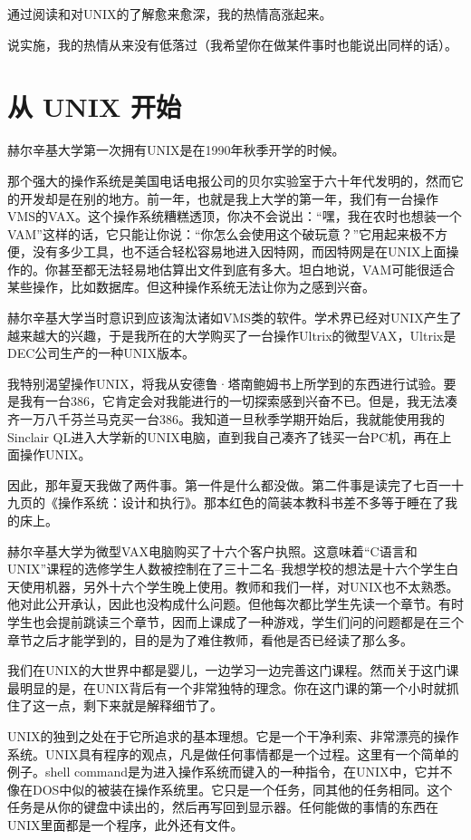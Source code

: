 通过阅读和对UNIX的了解愈来愈深，我的热情高涨起来。

说实施，我的热情从来没有低落过（我希望你在做某件事时也能说出同样的话）。

 
\section{从 UNIX 开始}

赫尔辛基大学第一次拥有UNIX是在1990年秋季开学的时候。

那个强大的操作系统是美国电话电报公司的贝尔实验室于六十年代发明的，然而它的开发却是在别的地方。前一年，也就是我上大学的第一年，我们有一台操作VMS的VAX。这个操作系统糟糕透顶，你决不会说出：“嘿，我在农时也想装一个VAM”这样的话，它只能让你说：“你怎么会使用这个破玩意？”它用起来极不方便，没有多少工具，也不适合轻松容易地进入因特网，而因特网是在UNIX上面操作的。你甚至都无法轻易地估算出文件到底有多大。坦白地说，VAM可能很适合某些操作，比如数据库。但这种操作系统无法让你为之感到兴奋。

赫尔辛基大学当时意识到应该淘汰诸如VMS类的软件。学术界已经对UNIX产生了越来越大的兴趣，于是我所在的大学购买了一台操作Ultrix的微型VAX，Ultrix是DEC公司生产的一种UNIX版本。

我特别渴望操作UNIX，将我从安德鲁·塔南鲍姆书上所学到的东西进行试验。要是我有一台386，它肯定会对我能进行的一切探索感到兴奋不已。但是，我无法凑齐一万八千芬兰马克买一台386。我知道一旦秋季学期开始后，我就能使用我的Sinclair QL进入大学新的UNIX电脑，直到我自己凑齐了钱买一台PC机，再在上面操作UNIX。

因此，那年夏天我做了两件事。第一件是什么都没做。第二件事是读完了七百一十九页的《操作系统：设计和执行》。那本红色的简装本教科书差不多等于睡在了我的床上。

赫尔辛基大学为微型VAX电脑购买了十六个客户执照。这意味着“C语言和UNIX”课程的选修学生人数被控制在了三十二名--我想学校的想法是十六个学生白天使用机器，另外十六个学生晚上使用。教师和我们一样，对UNIX也不太熟悉。他对此公开承认，因此也没构成什么问题。但他每次都比学生先读一个章节。有时学生也会提前跳读三个章节，因而上课成了一种游戏，学生们问的问题都是在三个章节之后才能学到的，目的是为了难住教师，看他是否已经读了那么多。

我们在UNIX的大世界中都是婴儿，一边学习一边完善这门课程。然而关于这门课最明显的是，在UNIX背后有一个非常独特的理念。你在这门课的第一个小时就抓住了这一点，剩下来就是解释细节了。

UNIX的独到之处在于它所追求的基本理想。它是一个干净利索、非常漂亮的操作系统。UNIX具有程序的观点，凡是做任何事情都是一个过程。这里有一个简单的例子。shell command是为进入操作系统而键入的一种指令，在UNIX中，它并不像在DOS中似的被装在操作系统里。它只是一个任务，同其他的任务相同。这个任务是从你的键盘中读出的，然后再写回到显示器。任何能做的事情的东西在UNIX里面都是一个程序，此外还有文件。

